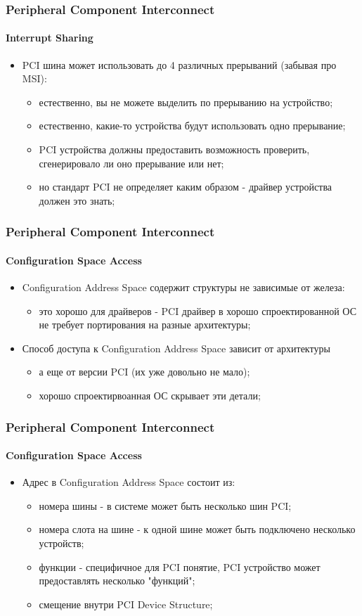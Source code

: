 \begin{frame}
\frametitle{Peripheral Component Interconnect}
\framesubtitle{Interrupt Sharing}
\begin{itemize}
  \item PCI шина может использовать до 4 различных прерываний (забывая про MSI):
    \begin{itemize}
      \item естественно, вы не можете выделить по прерыванию на устройство;
      \item естественно, какие-то устройства будут использовать одно прерывание;
      \item PCI устройства должны предоставить возможность проверить,
            сгенерировало ли оно прерывание или нет;
      \item но стандарт PCI не определяет каким образом - драйвер устройства
            должен это знать;
    \end{itemize}
\end{itemize}
\end{frame}

\begin{frame}
\frametitle{Peripheral Component Interconnect}
\framesubtitle{Configuration Space Access}
\begin{itemize}
  \item<1-> Configuration Address Space содержит структуры не зависимые от железа:
    \begin{itemize}
      \item это хорошо для драйверов - PCI драйвер в хорошо спроектированной ОС
            не требует портирования на разные архитектуры;
    \end{itemize}
  \item<2-> Способ доступа к Configuration Address Space зависит от архитектуры
    \begin{itemize}
      \item а еще от версии PCI (их уже довольно не мало);
      \item хорошо спроектирвоанная ОС скрывает эти детали;
    \end{itemize}
\end{itemize}
\end{frame}

\begin{frame}
\frametitle{Peripheral Component Interconnect}
\framesubtitle{Configuration Space Access}
\begin{itemize}
  \item Адрес в Configuration Address Space состоит из:
    \begin{itemize}
      \item номера шины - в системе может быть несколько шин PCI;
      \item номера слота на шине - к одной шине может быть подключено несколько
            устройств;
      \item функции - специфичное для PCI понятие, PCI устройство может
            предоставлять несколько "функций";
      \item смещение внутри PCI Device Structure;
    \end{itemize}
\end{itemize}
\end{frame}

